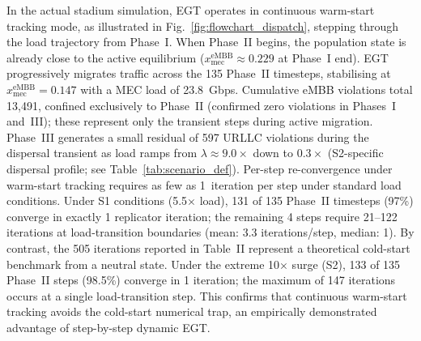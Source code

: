 \documentclass[conference]{IEEEtran}
\begin{document}
In the actual stadium simulation, EGT operates in continuous
warm-start tracking mode, as illustrated in
Fig.~\ref{fig:flowchart_dispatch}, stepping through the load
trajectory from Phase~I. When Phase~II begins, the population
state is already close to the active equilibrium
($x_\text{mec}^\text{eMBB} \approx 0.229$ at Phase~I end).
EGT progressively migrates traffic across the 135 Phase~II
timesteps, stabilising at $x_\text{mec}^\text{eMBB} = 0.147$
with a MEC load of 23.8~Gbps. Cumulative eMBB violations
total 13,491, confined exclusively to Phase~II (confirmed
zero violations in Phases~I and~III); these represent only
the transient steps during active migration.
Phase~III generates a small residual of 597 URLLC violations
during the dispersal transient as load ramps from $\lambda
\approx 9.0\times$ down to $0.3\times$ (S2-specific dispersal
profile; see Table~\ref{tab:scenario_def}).
Per-step re-convergence under warm-start tracking requires
as few as 1~iteration per step under standard load conditions.
Under S1 conditions (5.5$\times$ load), 131 of 135
Phase~II timesteps (97\%) converge in exactly 1 replicator
iteration; the remaining 4 steps require 21--122 iterations
at load-transition boundaries (mean: 3.3 iterations/step,
median: 1). By contrast, the 505 iterations reported in Table~II
represent a theoretical cold-start benchmark from a neutral state.
Under the extreme 10$\times$ surge (S2), 133 of 135
Phase~II steps (98.5\%) converge in 1 iteration; the maximum
of 147 iterations occurs at a single load-transition step.
This confirms that continuous warm-start tracking
avoids the cold-start numerical trap, an empirically
demonstrated advantage of step-by-step dynamic EGT.
\end{document}

